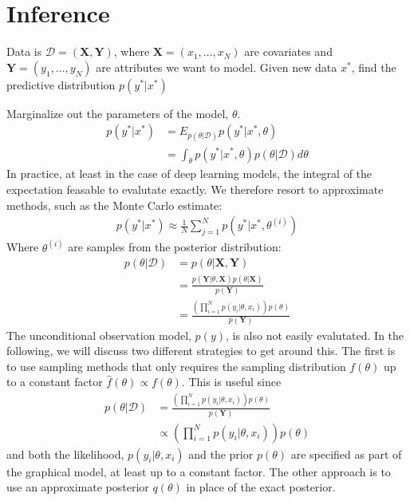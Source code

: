 \chapter{Inference}

Data is $\mathcal{D} = (\bm{X}, \bm{Y})$, where $\bm{X} = (x_1,\dots,x_N)$ are covariates and $\bm{Y} = (y_1, \dots, y_N)$ are attributes we want to model.
Given new data $x^\ast$, find the predictive distribution $p(y^\ast | x^\ast)$ 

Marginalize out the parameters of the model, $\theta$.
\begin{align*}
    p(y^\ast | x^\ast) &= E_{p(\theta|\mathcal{D})} p(y^\ast | x^\ast, \theta) \\
                       &= \int_{\theta} p(y^\ast | x^\ast, \theta)  p(\theta|\mathcal{D}) d\theta
\end{align*}
In practice, at least in the case of deep learning models, the integral of the expectation feasable to evalutate exactly. 
We therefore resort to approximate methods, such as the Monte Carlo estimate:
\begin{align*}
    p(y^\ast | x^\ast)  \approx \frac{1}{N} \sum_{j=1}^N p(y^\ast | x^\ast, \theta^{(i)}) 
\end{align*}
Where $\theta^{(i)}$ are samples from the posterior distribution:
\begin{align*}
    p(\theta | \mathcal{D}) 
    &= p(\theta | \bm{X}, \bm{Y}) \\
    &= \frac{p(\bm{Y} |\theta, \bm{X}) p(\theta|\bm{X})}{p(\bm{Y}) } \\
    &= \frac
    {\left(\prod_{i=1}^N p(y_i |\theta, x_i)\right) p(\theta)}
    {p(\bm{Y}) }  
\end{align*}
The unconditional  observation model, $p(y)$, is also not easily evalutated. 
In the following, we will discuss two different strategies to get around this. 
The first is to use sampling methods that only requires the sampling distribution $f(\theta)$ up to a constant factor $\hat{f}(\theta)\propto f(\theta)$. 
This is useful since 
\begin{align*}
    p(\theta | \mathcal{D}) 
    &= \frac
    {\left(\prod_{i=1}^N p(y_i |\theta, x_i)\right) p(\theta)}
    {p(\bm{Y}) }  \\
    &\propto \left(\prod_{i=1}^N p(y_i |\theta, x_i)\right) p(\theta)
\end{align*}
and both the likelihood, $p(y_i |\theta, x_i)$ and the prior $p(\theta)$ are specified as part of the graphical model, at least up to a constant factor. 
The other approach is to use an approximate posterior $q(\theta)$ in place of the exact posterior. 

